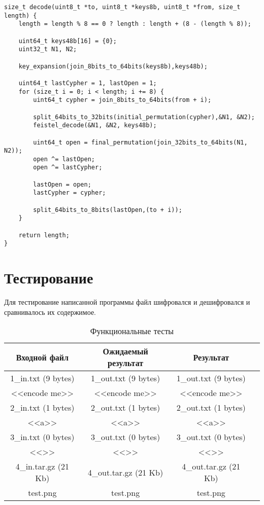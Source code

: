\begin{center}
\captionsetup{justification=raggedright,singlelinecheck=off}
\begin{lstlisting}[label=lst:decode,caption=Дешифрование DES]
size_t decode(uint8_t *to, uint8_t *keys8b, uint8_t *from, size_t length) {
	length = length % 8 == 0 ? length : length + (8 - (length % 8));
	
	uint64_t keys48b[16] = {0};
	uint32_t N1, N2;
	
	key_expansion(join_8bits_to_64bits(keys8b),keys48b);
	
	uint64_t lastCypher = 1, lastOpen = 1;
	for (size_t i = 0; i < length; i += 8) {
		uint64_t cypher = join_8bits_to_64bits(from + i);
		
		split_64bits_to_32bits(initial_permutation(cypher),&N1, &N2);
		feistel_decode(&N1, &N2, keys48b);
		
		uint64_t open = final_permutation(join_32bits_to_64bits(N1, N2));
		open ^= lastOpen;
		open ^= lastCypher;
		
		lastOpen = open;
		lastCypher = cypher;
		
		split_64bits_to_8bits(lastOpen,(to + i));
	}
	
	return length;
}
\end{lstlisting}
\end{center}
\FloatBarrier

\section{Тестирование}

Для тестирование написанной программы файл шифровался и дешифровался и сравнивалось их содержимое.

\begin{table}[h]
	\begin{center}
		\begin{threeparttable}
			\captionsetup{justification=raggedright,singlelinecheck=off}
			\caption{\label{tbl:functional_} Функциональные тесты}
			\begin{tabular}{|c|c|c|c|}
				\hline
				Входной файл & Ожидаемый результат & Результат \\ 
				\hline
				1\_in.txt (9 bytes) & 1\_out.txt (9 bytes) & 1\_out.txt (9 bytes)\\
				<<encode me>> & <<encode me>> &<<encode me>>\\
				\hline
				2\_in.txt (1 bytes) & 2\_out.txt (1 bytes) & 2\_out.txt (1 bytes)\\
				<<a>> & <<a>> &<<a>>\\
				\hline
				3\_in.txt (0 bytes) & 3\_out.txt (0 bytes) & 3\_out.txt (0 bytes)\\
				<<>> & <<>> &<<>>\\
				\hline
				4\_in.tar.gz (21 Kb) & 4\_out.tar.gz (21 Kb) & 4\_out.tar.gz (21 Kb)\\
				test.png & test.png & test.png\\
				\hline
			\end{tabular}
		\end{threeparttable}
	\end{center}
\end{table}
\FloatBarrier

